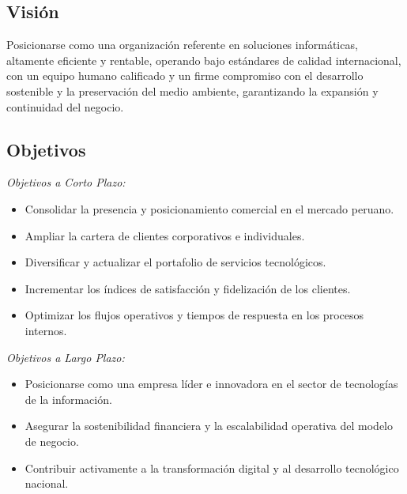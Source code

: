 \subsection{Visión}
Posicionarse como una organización referente en soluciones informáticas, altamente eficiente y rentable, operando bajo estándares de calidad internacional, con un equipo humano calificado y un firme compromiso con el desarrollo sostenible y la preservación del medio ambiente, garantizando la expansión y continuidad del negocio.

\subsection{Objetivos}
\noindent\textit{Objetivos a Corto Plazo:}
\begin{itemize}
    \item Consolidar la presencia y posicionamiento comercial en el mercado peruano.
    \item Ampliar la cartera de clientes corporativos e individuales.
    \item Diversificar y actualizar el portafolio de servicios tecnológicos.
    \item Incrementar los índices de satisfacción y fidelización de los clientes.
    \item Optimizar los flujos operativos y tiempos de respuesta en los procesos internos.
\end{itemize}

\noindent\textit{Objetivos a Largo Plazo:}
\begin{itemize}
    \item Posicionarse como una empresa líder e innovadora en el sector de tecnologías de la información.
    \item Asegurar la sostenibilidad financiera y la escalabilidad operativa del modelo de negocio.
    \item Contribuir activamente a la transformación digital y al desarrollo tecnológico nacional.
\end{itemize}

